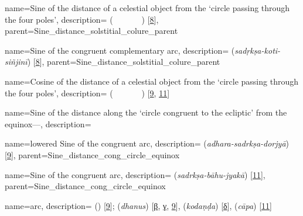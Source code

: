 {
        name={Sine of the distance of a celestial object from the `circle passing through the four poles'},
        description={ (\jayb\idafaconsonant\ \bud\idafaconsonant\ \kawkab\ \az\ \guillemotleft\dayiri\idafavowel\ \marri\ \biaqtab\idafaconsonant\ \arbai\guillemotright) [\hyperlink{PEpass8}{8}]},
        parent={Sine_distance_solstitial_colure_parent}
}        

{
        name={Sine of the congruent complementary arc},
        description={ (\textit{sadṛkṣa-koti-siñjinī}) [\hyperlink{SEpass8}{8}]},
        parent={Sine_distance_solstitial_colure_parent}
}


{
        name={Cosine of the distance of a celestial object from the `circle passing through the four poles'},
        description={ (\jayb\idafaconsonant\ \tamam\idafaconsonant\ \bud\ \az\ \guillemotleft\dayiri\idafavowel\ \marri\ \biaqtab\idafaconsonant\ \arbai\guillemotright) [\hyperlink{PEpass9}{9}, \hyperlink{PEpass11}{11}]}
}

{
        name={Sine of the distance along the `circle congruent to the ecliptic' from the \linebreak equinox---},
        description={\phantom{x}\nopagebreak}
}

{
        name={lowered Sine of the congruent arc},
        description={ (\textit{adhara-sadrkṣa-dorjyā}) [\hyperlink{SEpass9}{9}]},
        parent={Sine_distance_cong_circle_equinox}
}

{
        name={Sine of the congruent arc},
        description={ (\textit{sadrkṣa-bāhu-jyakā}) [\hyperlink{SEpass11}{11}]},
        parent={Sine_distance_cong_circle_equinox}
}

{
        name={arc},
        description={ (\qaws) [\hyperlink{PEpass9}{9}];  (\textit{dhanus}) [\hyperlink{SEpassB}{β}, \hyperlink{SEpassC}{γ}, \hyperlink{SEpass9}{9}],  (\textit{kodaṇḍa}) [\hyperlink{SEpassD}{δ}],  (\textit{cāpa}) [\hyperlink{SEpass11}{11}]}
}

